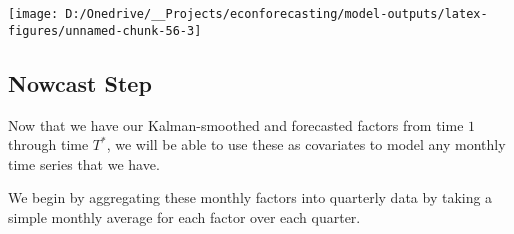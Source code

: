 \documentclass[11pt, letterpaper]{article}\usepackage[]{graphicx}\usepackage[]{color}
\begin{document}
{\centering \texttt{[image: D:/Onedrive/\_\_Projects/econforecasting/model-outputs/latex-figures/unnamed-chunk-56-3]} 

}





\subsection{Nowcast Step}
Now that we have our Kalman-smoothed and forecasted factors from time $1$ through time $T^*$, we will be able to use these as covariates to model any monthly time series that we have.

We begin by aggregating these monthly factors into quarterly data by taking a simple monthly average for each factor over each quarter.
\end{document}
